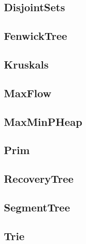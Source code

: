 \subsection{ DisjointSets}
\raggedbottom
\hrulefill
\subsection{ FenwickTree}
\raggedbottom
\hrulefill
\subsection{ Kruskals}
\raggedbottom
\hrulefill
\subsection{ MaxFlow}
\raggedbottom
\hrulefill
\subsection{ MaxMinPHeap}
\raggedbottom
\hrulefill
\subsection{ Prim}
\raggedbottom
\hrulefill
\subsection{ RecoveryTree}
\raggedbottom
\hrulefill
\subsection{ SegmentTree}
\raggedbottom
\hrulefill
\subsection{ Trie}
\raggedbottom
\hrulefill

